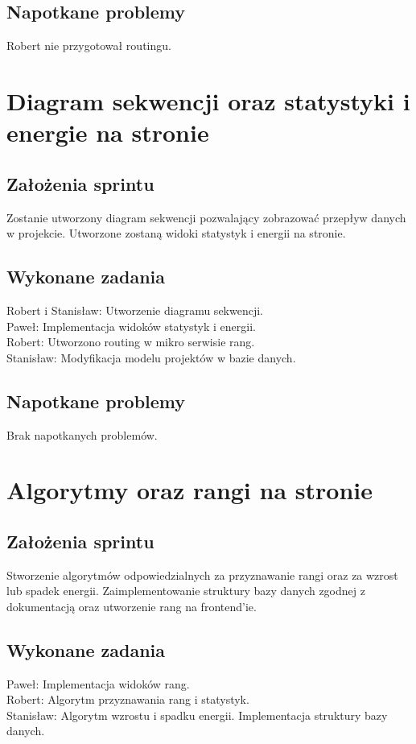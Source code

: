 \documentclass[a4paper,11pt]{report}
\begin{document}
\subsection {Napotkane problemy}
Robert nie przygotował routingu.

\section {Diagram sekwencji oraz statystyki i energie na stronie}
\subsection {Założenia sprintu}
Zostanie utworzony diagram sekwencji pozwalający zobrazować przepływ danych w projekcie. Utworzone zostaną widoki statystyk i energii na stronie.
\subsection {Wykonane zadania}
Robert i Stanisław: Utworzenie diagramu sekwencji.\\
Paweł: Implementacja widoków statystyk i energii. \\
Robert: Utworzono routing w mikro serwisie rang.\\
Stanisław: Modyfikacja modelu projektów w bazie danych.\\
\subsection {Napotkane problemy}
Brak napotkanych problemów.

\section {Algorytmy oraz rangi na stronie}
\subsection {Założenia sprintu}
Stworzenie algorytmów odpowiedzialnych za przyznawanie rangi oraz za wzrost lub spadek energii. Zaimplementowanie struktury bazy danych zgodnej z dokumentacją oraz utworzenie rang na frontend'ie.
\subsection {Wykonane zadania}
Paweł: Implementacja widoków rang. \\
Robert: Algorytm przyznawania rang i statystyk.\\
Stanisław: Algorytm wzrostu i spadku energii. Implementacja struktury bazy danych.\\
\end{document}
